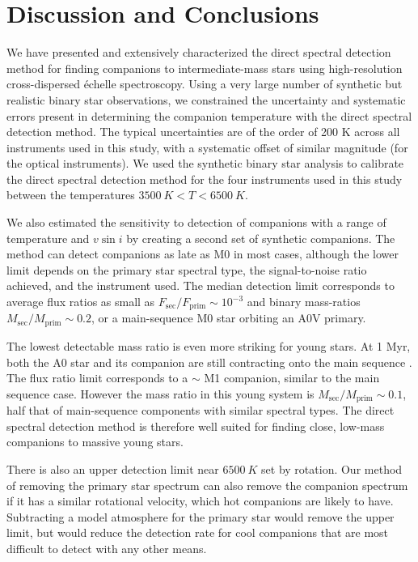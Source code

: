 \section{Discussion and Conclusions}
\label{paper5_sec:conclusions}
We have presented and extensively characterized the direct spectral detection method for finding companions to intermediate-mass stars using high-resolution cross-dispersed \'echelle spectroscopy. Using a very large number of synthetic but realistic binary star observations, we constrained the uncertainty and systematic errors present in determining the companion temperature with the direct spectral detection method. The typical uncertainties are of the order of 200 K across all instruments used in this study, with a systematic offset of similar magnitude (for the optical instruments). We used the synthetic binary star analysis to calibrate the direct spectral detection method for the four instruments used in this study between the temperatures $ 3500\ K < T < 6500\ K$.

We also estimated the sensitivity to detection of companions with a range of temperature and $v\sin{i}$ by creating a second set of synthetic companions. The method can detect companions as late as M0 in most cases, although the lower limit depends on the primary star spectral type, the signal-to-noise ratio achieved, and the instrument used. The median detection limit corresponds to average flux ratios as small as $F_\mathrm{sec}/F_\mathrm{prim} \sim 10^{-3}$ and binary mass-ratios $M_\mathrm{sec}/M_\mathrm{prim} \sim 0.2$, or a main-sequence M0 star orbiting an A0V primary.

The lowest detectable mass ratio is even more striking for young stars. At 1 Myr, both the A0 star and its companion are still contracting onto the main sequence \citep{Bressan2012}. The flux ratio limit corresponds to a $\sim$ M1 companion, similar to the main sequence case. However the mass ratio in this young system is $M_\mathrm{sec}/M_\mathrm{prim} \sim 0.1$, half that of main-sequence components with similar spectral types. The direct spectral detection method is therefore well suited for finding close, low-mass companions to massive young stars.

There is also an upper detection limit near $6500\ K$ set by rotation. Our method of removing the primary star spectrum can also remove the companion spectrum if it has a similar rotational velocity, which hot companions are likely to have. Subtracting a model atmosphere for the primary star would remove the upper limit, but would reduce the detection rate for cool companions that are most difficult to detect with any other means.


